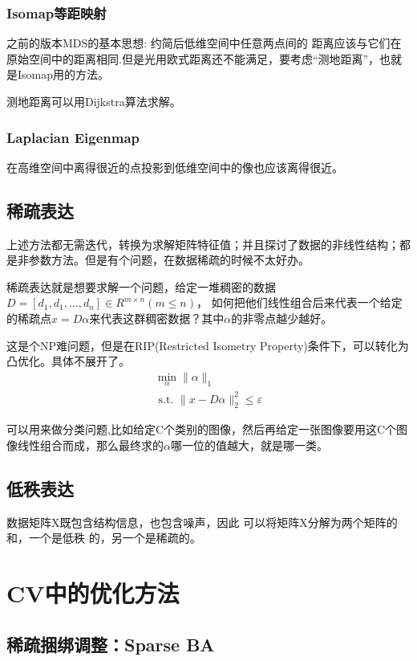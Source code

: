 \documentclass[12pt]{article}
\begin{document}
\subsubsection{Isomap等距映射}
之前的版本MDS的基本思想: 约简后低维空间中任意两点间的 距离应该与它们在原始空间中的距离相同.但是光用欧式距离还不能满足，要考虑“测地距离”，也就是Isomap用的方法。

测地距离可以用Dijkstra算法求解。

\subsubsection{Laplacian Eigenmap}
在高维空间中离得很近的点投影到低维空间中的像也应该离得很近。

\subsection{稀疏表达}
上述方法都无需迭代，转换为求解矩阵特征值；并且探讨了数据的非线性结构；都是非参数方法。但是有个问题，在数据稀疏的时候不太好办。

稀疏表达就是想要求解一个问题，给定一堆稠密的数据$D=\left[d_{1}, d_{1}, \ldots, d_{n}\right] \in R^{m \times n}(m \leq n)$，
如何把他们线性组合后来代表一个给定的稀疏点$x=D\alpha$来代表这群稠密数据？其中$\alpha$的非零点越少越好。

这是个NP难问题，但是在RIP(Restricted Isometry Property)条件下，可以转化为凸优化。具体不展开了。
\begin{equation}
    \nonumber
    \begin{array}{l}
        \min _{\alpha}\|\alpha\|_{1} \\
        \text { s.t. }\|x-D \alpha\|_{2}^{2} \leq \varepsilon
        \end{array}
\end{equation}

可以用来做分类问题,比如给定C个类别的图像，然后再给定一张图像要用这C个图像线性组合而成，那么最终求的$\alpha$哪一位的值越大，就是哪一类。

\subsection{低秩表达}
数据矩阵X既包含结构信息，也包含噪声，因此
可以将矩阵X分解为两个矩阵的和，一个是低秩 的，另一个是稀疏的。

\section{CV中的优化方法}
\subsection{稀疏捆绑调整：Sparse BA}
\end{document}
